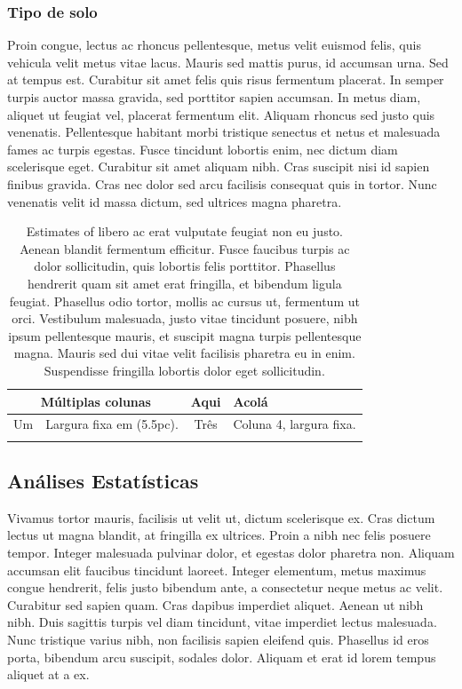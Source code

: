 \documentclass[book,A4paper,10pt,twoside,oldfontcommands]{memoir}\usepackage[]{graphicx}\usepackage[usenames,dvipsnames]{color}
\begin{document}
\begin{btUnit}
\subsubsection{Tipo de solo}

Proin congue, lectus ac rhoncus pellentesque, metus velit euismod
felis, quis vehicula velit metus vitae lacus. Mauris sed mattis purus,
id accumsan urna. Sed at tempus est. Curabitur sit amet felis quis
risus fermentum placerat. In semper turpis auctor massa gravida, sed
porttitor sapien accumsan. In metus diam, aliquet ut feugiat vel,
placerat fermentum elit. Aliquam rhoncus sed justo quis venenatis.
Pellentesque habitant morbi tristique senectus et netus et malesuada
fames ac turpis egestas. Fusce tincidunt lobortis enim, nec dictum
diam scelerisque eget. Curabitur sit amet aliquam nibh. Cras suscipit
nisi id sapien finibus gravida. Cras nec dolor sed arcu facilisis
consequat quis in tortor. Nunc venenatis velit id massa dictum, sed
ultrices magna pharetra.


\begin{table}
\centering
\caption{Estimates of libero ac erat vulputate feugiat non
  eu justo. Aenean blandit fermentum efficitur. Fusce faucibus turpis
  ac dolor sollicitudin, quis lobortis felis porttitor. Phasellus
  hendrerit quam sit amet erat fringilla, et bibendum ligula feugiat.
  Phasellus odio tortor, mollis ac cursus ut, fermentum ut orci.
  Vestibulum malesuada, justo vitae tincidunt posuere, nibh ipsum
  pellentesque mauris, et suscipit magna turpis pellentesque magna.
  Mauris sed dui vitae velit facilisis pharetra eu in enim.
  Suspendisse fringilla lobortis dolor eget sollicitudin.}
\begin{tabular}{ c p{5.5pc} c p{5.5pc} }
\hline
\multicolumn{2}{c}{Múltiplas colunas} & Aqui & Acolá \\
\hline
Um & \raggedright\arraybackslash Largura fixa em (5.5pc). & Três &
\raggedright\arraybackslash Coluna 4, largura fixa.\\
\hline
\label{Tab:estim2}
\end{tabular}
\end{table}

\subsection{Análises Estatísticas}


Vivamus tortor mauris, facilisis ut velit ut, dictum scelerisque ex.
Cras dictum lectus ut magna blandit, at fringilla ex ultrices. Proin a
nibh nec felis posuere tempor. Integer malesuada pulvinar dolor, et
egestas dolor pharetra non. Aliquam accumsan elit faucibus tincidunt
laoreet. Integer elementum, metus maximus congue hendrerit, felis
justo bibendum ante, a consectetur neque metus ac velit. Curabitur sed
sapien quam. Cras dapibus imperdiet aliquet. Aenean ut nibh nibh. Duis
sagittis turpis vel diam tincidunt, vitae imperdiet lectus malesuada.
Nunc tristique varius nibh, non facilisis sapien eleifend quis.
Phasellus id eros porta, bibendum arcu suscipit, sodales dolor.
Aliquam et erat id lorem tempus aliquet at a ex.


\end{btUnit}
\end{document}
